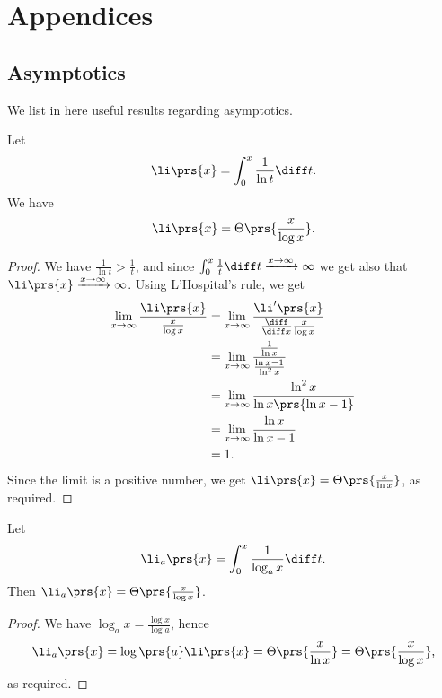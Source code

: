 \documentclass[oneside]{scrbook}
\theoremstyle{definition}
\begin{document}
\appendix

\chapter{Appendices}
\section{Asymptotics}

We list in here useful results regarding asymptotics.

\begin{lemma} \label{lemma:li-asymptotics}
Let
\begin{align*}
\li\prs{x} = \int_0^x \frac{1}{\ln t} \diff t \text{.}
\end{align*}
We have
\begin{align*}
\li\prs{x} = \Theta\prs{\frac{x}{\log x}} \text{.}
\end{align*}
\end{lemma}

\begin{proof}
We have $\frac{1}{\ln t} > \frac{1}{t}$, and since $\int_0^x \frac{1}{t} \diff t \xrightarrow{x \to \infty} \infty$ we get also that $\li\prs{x} \xrightarrow{x\to\infty} \infty$.
Using L'Hospital's rule, we get
\begin{align*}
\lim_{x\to\infty} \frac{\li\prs{x}}{\frac{x}{\log x}} &= \lim_{x\to\infty} \frac{\li'\prs{x}}{\frac{\diff}{\diff x}\frac{x}{\log x}}
\\&=
\lim_{x\to\infty} \frac{\frac{1}{\ln x}}{\frac{\ln x - 1}{\ln^2 x}}
\\&=
\lim_{x\to\infty} \frac{\ln^2 x}{\ln x \prs{\ln x - 1}}
\\&=
\lim_{x\to\infty} \frac{\ln x}{\ln x - 1}
\\&= 1 \text{.}
\end{align*}
Since the limit is a positive number, we get $\li\prs{x} = \Theta\prs{\frac{x}{\ln x}}$, as required.
\end{proof}

\begin{corollary} \label{corollary:li-asymptotics}
Let
\begin{align*}
\li_a\prs{x} = \int_0^x \frac{1}{\log_a x} \diff t \text{.}
\end{align*}
Then $\li_a\prs{x} = \Theta\prs{\frac{x}{\log x}}$.
\end{corollary}

\begin{proof}
We have $\log_a x = \frac{\log x}{\log a}$, hence \[\li_a\prs{x} = \log \prs{a} \li\prs{x} = \Theta\prs{\frac{x}{\ln x}} = \Theta\prs{\frac{x}{\log x}} \text{,}\]
as required.
\end{proof}

\printbibliography
\printindex
\end{document}
